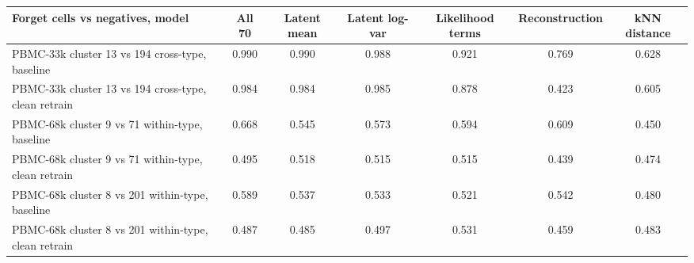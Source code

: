 \begin{tabular}{lcccccc}
\toprule
Forget cells vs negatives, model & All 70 & Latent mean & Latent log-var & Likelihood terms & Reconstruction & kNN distance \\
\midrule
PBMC-33k cluster 13 vs 194 cross-type, baseline & 0.990 & 0.990 & 0.988 & 0.921 & 0.769 & 0.628 \\
PBMC-33k cluster 13 vs 194 cross-type, clean retrain & 0.984 & 0.984 & 0.985 & 0.878 & 0.423 & 0.605 \\
PBMC-68k cluster 9 vs 71 within-type, baseline & 0.668 & 0.545 & 0.573 & 0.594 & 0.609 & 0.450 \\
PBMC-68k cluster 9 vs 71 within-type, clean retrain & 0.495 & 0.518 & 0.515 & 0.515 & 0.439 & 0.474 \\
PBMC-68k cluster 8 vs 201 within-type, baseline & 0.589 & 0.537 & 0.533 & 0.521 & 0.542 & 0.480 \\
PBMC-68k cluster 8 vs 201 within-type, clean retrain & 0.487 & 0.485 & 0.497 & 0.531 & 0.459 & 0.483 \\
\bottomrule
\end{tabular}
